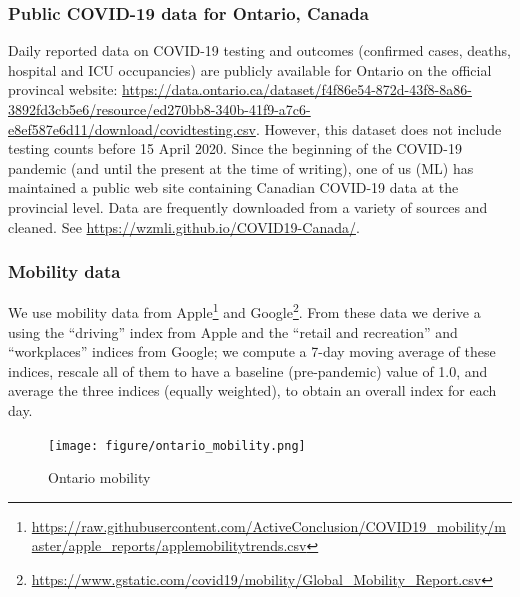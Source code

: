 \documentclass[12pt]{article}\usepackage[]{graphicx}\usepackage[]{color}
\begin{document}
\subsubsection*{Public COVID-19 data for Ontario, Canada}

Daily reported data on COVID-19 testing and outcomes (confirmed cases, deaths, hospital and ICU occupancies) are publicly available for Ontario on the official provincal website:
\url{https://data.ontario.ca/dataset/f4f86e54-872d-43f8-8a86-3892fd3cb5e6/resource/ed270bb8-340b-41f9-a7c6-e8ef587e6d11/download/covidtesting.csv}.
However, this dataset does not include testing counts before 15 April 2020.  Since the beginning of the COVID-19 pandemic (and until the present at the time of writing), one of us (ML) has maintained a public web site containing Canadian COVID-19 data at the provincial level.  Data are frequently downloaded from a variety of sources and cleaned.  See \url{https://wzmli.github.io/COVID19-Canada/}.

\hypertarget{Mobility data}{}
\subsubsection*{Mobility data}

We use mobility data from Apple\footnote{\url{https://raw.githubusercontent.com/ActiveConclusion/COVID19_mobility/master/apple_reports/applemobilitytrends.csv}} and Google\footnote{\url{https://www.gstatic.com/covid19/mobility/Global_Mobility_Report.csv}}.  From these data we derive a  using the ``driving'' index from Apple and the ``retail and recreation'' and ``workplaces'' indices from Google; we compute a 7-day moving average of these indices, rescale all of them to have a baseline (pre-pandemic) value of 1.0, and average the three indices (equally weighted), to obtain an overall index for each day.


\begin{figure}[ht!]
\texttt{[image: figure/ontario\_mobility.png]}

\caption{Ontario mobility 
}
\label{fig:Ont_mobility}
\end{figure}
\end{document}
